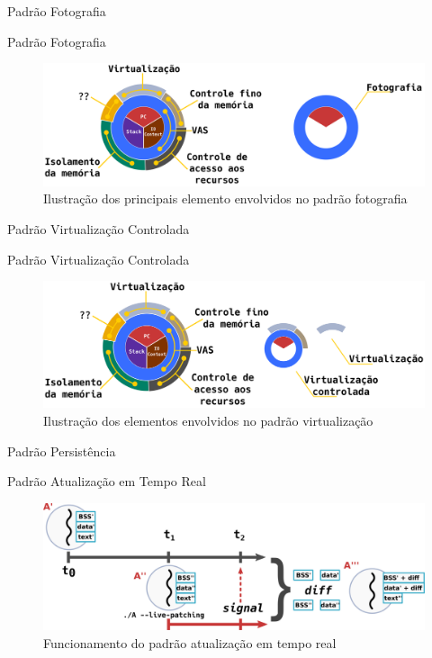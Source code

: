 \documentclass[xcolor={usenames,svgnames,dvipsnames},brazil,english,12pt,aspectratio=149]{beamer}
\begin{document}
\begin{frame}{Padrão Fotografia}
\end{frame}

\begin{frame}{Padrão Fotografia}
  \begin{figure}[!h]
    \centering
    \includegraphics[width=.8\textwidth]{decomposition_fotografia}
    \caption{Ilustração dos principais elemento envolvidos no padrão fotografia}
    \label{fig:decomposicao_fotografia}
  \end{figure}
\end{frame}

\begin{frame}{Padrão Virtualização Controlada}
\end{frame}

\begin{frame}{Padrão Virtualização Controlada}
  \begin{figure}[!h]
    \centering
    \includegraphics[width=.8\textwidth]{decomposicao_virt_controlada}
    \caption{Ilustração dos elementos envolvidos no padrão virtualização}
    \label{fig:decomposicao_virt}
  \end{figure}
\end{frame}

\begin{frame}{Padrão Persistência}
\end{frame}

\begin{frame}{Padrão Atualização em Tempo Real}
  \begin{figure}[!h]
    \centering
    \includegraphics[width=\textwidth]{live-patching}
    \caption{Funcionamento do padrão atualização em tempo real}
    \label{fig:atr}
  \end{figure}
\end{frame}
\end{document}
